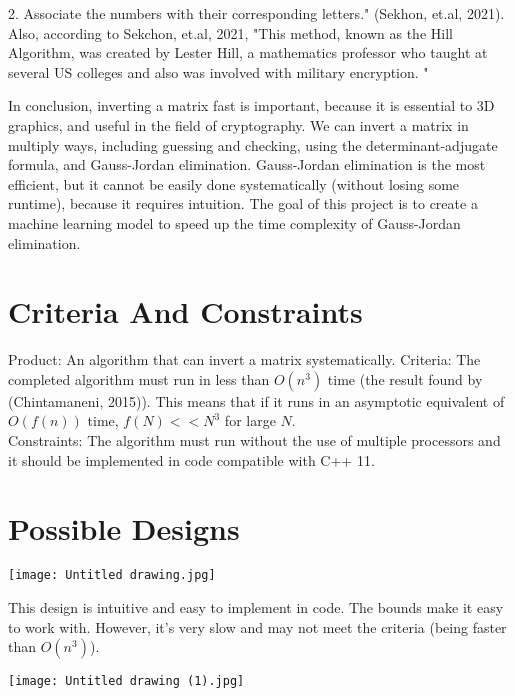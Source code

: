 \documentclass{article}
\begin{document}
2. Associate the numbers with their corresponding letters." (Sekhon, et.al, 2021). \\ Also, according to Sekchon, et.al, 2021, "This method, known as the Hill Algorithm, was created by Lester Hill, a mathematics professor who taught at several US colleges and also was involved with military encryption. "
\par In conclusion, inverting a matrix fast is important, because it is essential to 3D graphics, and useful in the field of cryptography. We can invert a matrix in multiply ways, including guessing and checking, using the determinant-adjugate formula, and Gauss-Jordan elimination. Gauss-Jordan elimination is the most efficient, but it cannot be easily done systematically (without losing some runtime), because it requires intuition. The goal of this project is to create a machine learning model to speed up the time complexity of Gauss-Jordan elimination. 
\newpage
\section*{Criteria And Constraints}
Product: An algorithm that can invert a matrix systematically.
Criteria: The completed algorithm must run in less than $O(n^3)$ time (the result found by (Chintamaneni, 2015)). This means that if it runs in an asymptotic equivalent of $O(f(n))$ time, $f(N)<<N^3$ for large $N$. \\
Constraints: The algorithm must run without the use of multiple processors and it should be implemented in code compatible with C++ 11.
\\ 
\section*{Possible Designs}
\begin{center}\texttt{[image: Untitled drawing.jpg]}\end{center}

This design is intuitive and easy to implement in code. The bounds make it easy to work with. However, it's very slow and may not meet the criteria (being faster than $O(n^3)$).

\begin{center}\texttt{[image: Untitled drawing (1).jpg]}\end{center}
\end{document}
